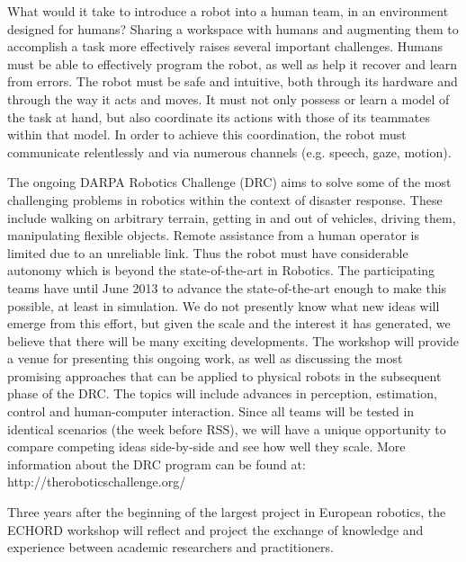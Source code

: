 \begin{spacing}{1.0}
{
What would it take to introduce a robot into a human team, in an environment designed for humans? Sharing a workspace with humans and augmenting them to accomplish a task more effectively raises several important challenges. Humans must be able to effectively program the robot, as well as help it recover and learn from errors. The robot must be safe and intuitive, both through its hardware and through the way it acts and moves. It must not only possess or learn a model of the task at hand, but also coordinate its actions with those of its teammates within that model. In order to achieve this coordination, the robot must communicate relentlessly and via numerous channels (e.g. speech, gaze, motion). 
}



{
The ongoing DARPA Robotics Challenge (DRC) aims to solve some of the most challenging problems in robotics within the context of disaster response. These include walking on arbitrary terrain, getting in and out of vehicles, driving them, manipulating flexible objects. Remote assistance from a human operator is limited due to an unreliable link. Thus the robot must have considerable autonomy which is beyond the state-of-the-art in Robotics. The participating teams have until June 2013 to advance the state-of-the-art enough to make this possible, at least in simulation. We do not presently know what new ideas will emerge from this effort, but given the scale and the interest it has generated, we believe that there will be many exciting developments. The workshop will provide a venue for presenting this ongoing work, as well as discussing the most promising approaches that can be applied to physical robots in the subsequent phase of the DRC. The topics will include advances in perception, estimation, control 
and human-computer interaction. Since all teams will be tested in identical scenarios (the week before RSS), we will have a unique opportunity to compare competing ideas side-by-side and see how well they scale. More information about the DRC program can be found at: http://theroboticschallenge.org/
}


{
Three years after the beginning of the largest project in European robotics, the ECHORD workshop will reflect and project the exchange of knowledge and experience between academic researchers and practitioners.

}
\end{spacing}

